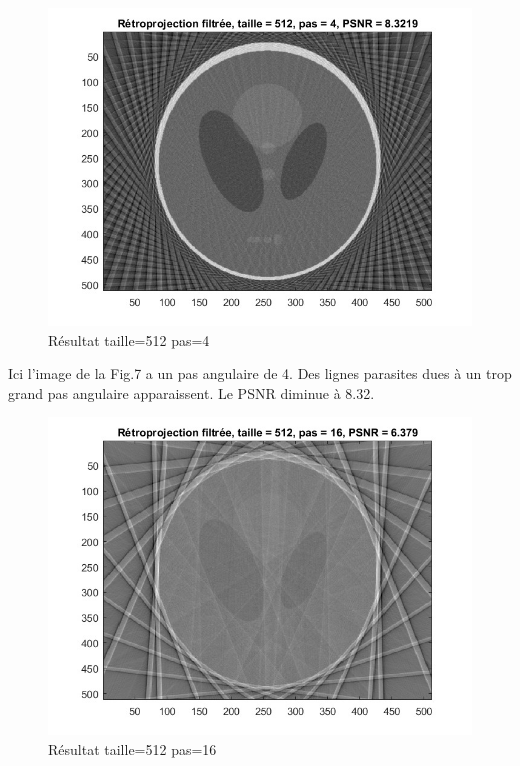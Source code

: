 \documentclass[conference]{IEEEtran}
\begin{document}
\begin{figure}[H]
\centering
\includegraphics[scale=0.5]{t512-p4}
	\caption[Résultat taille=512 pas=4]{Résultat taille=512 pas=4}
\label{fig:gallery}
\end{figure}

Ici l'image de la Fig.7 a un pas angulaire de 4. Des lignes parasites dues à un trop grand pas angulaire apparaissent. Le PSNR diminue à 8.32.

\begin{figure}[H]
\centering
\includegraphics[scale=0.5]{t512-p16}
	\caption[Résultat taille=512 pas=16]{Résultat taille=512 pas=16}
\label{fig:gallery}
\end{figure}
\end{document}
